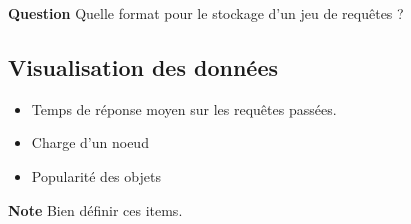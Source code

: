 \documentclass[12pt]{article}
\begin{document}
\vspace{0.5cm}

\textbf{Question } Quelle format pour le stockage d'un jeu de requêtes ? \newline

\subsection{Visualisation des données}

\begin{itemize}
 \item Temps de réponse moyen sur les requêtes passées.
 \item Charge d'un noeud
 \item Popularité des objets
\end{itemize}

\vspace{0.5cm}

\textbf{Note } Bien définir ces items. \newline
\end{document}
